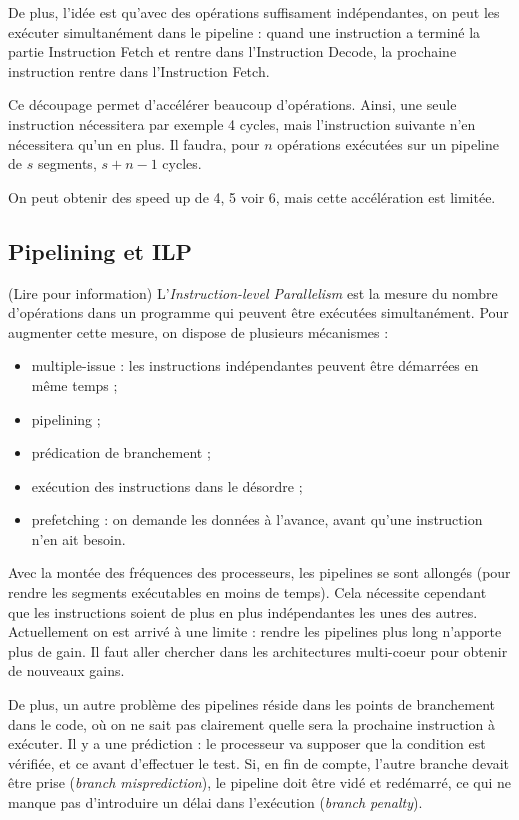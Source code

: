 	De plus, l'idée est qu'avec des opérations suffisament indépendantes, on peut les exécuter simultanément dans le pipeline : quand une instruction a terminé la partie Instruction Fetch et rentre dans l'Instruction Decode, la prochaine instruction rentre dans l'Instruction Fetch.
	
	
	Ce découpage permet d'accélérer beaucoup d'opérations. Ainsi, une seule instruction nécessitera par exemple 4 cycles, mais l'instruction suivante n'en nécessitera qu'un en plus. Il faudra, pour $n$ opérations exécutées sur un pipeline de $s$ segments, $s + n - 1$ cycles.
	
	On peut obtenir des speed up de 4, 5 voir 6, mais cette accélération est limitée.
	
	\subsection{Pipelining et ILP}
	
	(Lire pour information) L'\textit{Instruction-level Parallelism} est la mesure du nombre d'opérations dans un programme qui peuvent être exécutées simultanément. Pour augmenter cette mesure, on dispose de plusieurs mécanismes :
	
	\begin{itemize}
		\item multiple-issue : les instructions indépendantes peuvent être démarrées en même temps ;
		\item pipelining ;
		\item prédication de branchement ;
		\item exécution des instructions dans le désordre ;
		\item prefetching : on demande les données à l'avance, avant qu'une instruction n'en ait besoin.
	\end{itemize}
	
	Avec la montée des fréquences des processeurs, les pipelines se sont allongés (pour rendre les segments exécutables en moins de temps). Cela nécessite cependant que les instructions soient de plus en plus indépendantes les unes des autres. Actuellement on est arrivé à une limite : rendre les pipelines plus long n'apporte plus de gain. Il faut aller chercher dans les architectures multi-coeur pour obtenir de nouveaux gains.
	
	De plus, un autre problème des pipelines réside dans les points de branchement dans le code, où on ne sait pas clairement quelle sera la prochaine instruction à exécuter. Il y a une prédiction : le processeur va supposer que la condition est vérifiée, et ce avant d'effectuer le test. Si, en fin de compte, l'autre branche devait être prise (\textit{branch misprediction}), le pipeline doit être vidé et redémarré, ce qui ne manque pas d'introduire un délai dans l'exécution (\textit{branch penalty}).

